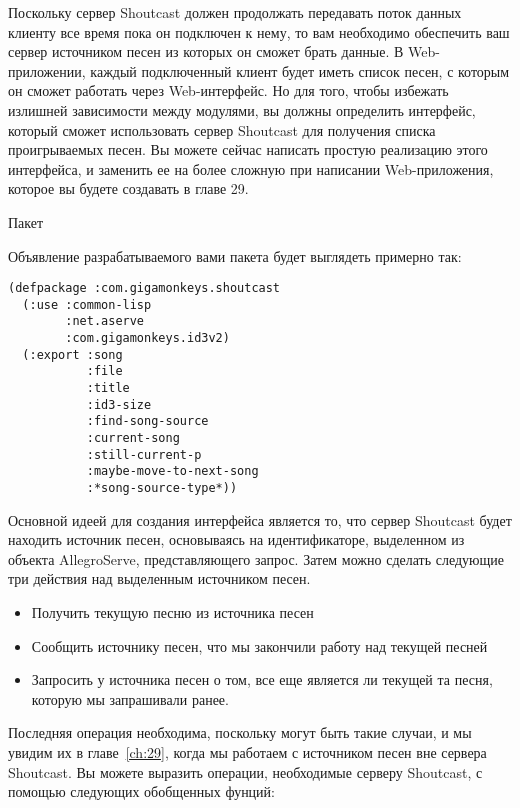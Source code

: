 Поскольку сервер Shoutcast должен продолжать передавать поток данных клиенту все время
пока он подключен к нему, то вам необходимо обеспечить ваш сервер источником песен из
которых он сможет брать данные.  В Web-приложении, каждый подключенный клиент будет иметь
список песен, с которым он сможет работать через Web-интерфейс.  Но для того, чтобы
избежать излишней зависимости между модулями, вы должны определить интерфейс, который
сможет использовать сервер Shoutcast для получения списка проигрываемых песен. Вы можете
сейчас написать простую реализацию этого интерфейса, и заменить ее на более сложную при
написании Web-приложения, которое вы будете создавать в главе 29.


Пакет

Объявление разрабатываемого вами пакета будет выглядеть примерно так:

\begin{lstlisting}
(defpackage :com.gigamonkeys.shoutcast
  (:use :common-lisp 
        :net.aserve 
        :com.gigamonkeys.id3v2)
  (:export :song
           :file
           :title
           :id3-size
           :find-song-source
           :current-song
           :still-current-p
           :maybe-move-to-next-song
           :*song-source-type*))
\end{lstlisting}


Основной идеей для создания интерфейса является то, что сервер Shoutcast будет находить
источник песен, основываясь на идентификаторе, выделенном из объекта AllegroServe,
представляющего запрос.  Затем можно сделать следующие три действия над выделенным
источником песен.

\begin{itemize}
\item Получить текущую песню из источника песен
\item Сообщить источнику песен, что мы закончили работу над текущей песней
\item Запросить у источника песен о том, все еще является ли текущей та песня, которую мы
  запрашивали ранее.
\end{itemize}

Последняя операция необходима, поскольку могут быть такие случаи, и мы увидим их в
главе~\ref{ch:29}, когда мы работаем с источником песен вне сервера Shoutcast.  Вы можете
выразить операции, необходимые серверу Shoutcast, с помощью следующих обобщенных фунций:

